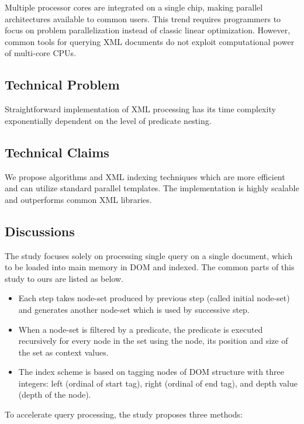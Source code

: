 \documentclass{paper}
\begin{document}
	Multiple processor cores are integrated on a single chip, making
	parallel architectures available to common users. This trend requires
	programmers to focus on problem parallelization instead of classic
	linear optimization. However, common tools for querying XML documents 
	do not exploit computational power of multi-core CPUs. 
	
	
	\subsection{Technical Problem}
	
	Straightforward implementation of XML processing has its time 
	complexity exponentially dependent on the level of predicate nesting. 
	
	\subsection{Technical Claims}
	
	We propose algorithms and XML indexing techniques which are more
	efficient and can utilize standard parallel templates. The implementation 
	is highly scalable and outperforms common XML libraries.
	
	\subsection{Discussions} 
	
	The study focuses solely on processing single query on a single
	document, which to be loaded into main memory in DOM and indexed. 
	The common parts of this study to ours are listed as below.
	
	\begin{itemize}  
		\item Each step takes node-set produced by previous step (called initial
		node-set) and generates another node-set which is used by successive
		step.
		\item When a node-set is filtered by a predicate, the predicate is executed
		recursively for every node in the set using the node, its position
		and size of the set as context values. 
		\item The index scheme is based on tagging nodes of DOM structure with three 
		integers: left (ordinal of start tag), right (ordinal of end tag), and 
		depth value (depth of the node).
	\end{itemize}
	
	To accelerate query processing, the study proposes three methods:
	
\end{document}
